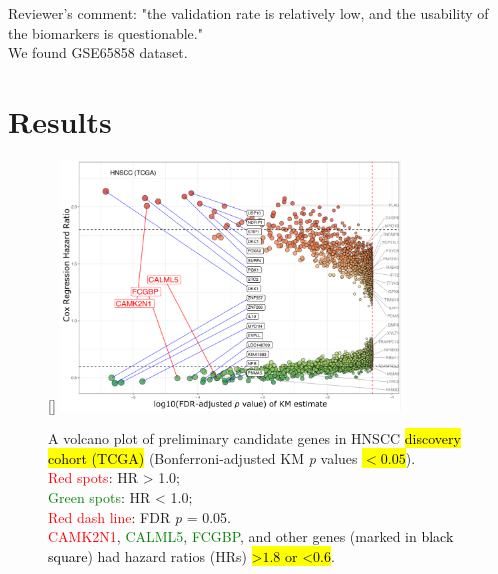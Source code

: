 \documentclass[
paper=landscape,
paper=160mm:90mm, %
fontsize=11pt, %
pagesize, %
parskip=half-, %
]{scrartcl} %
\theoremstyle{mythmstyle} %
\begin{document}
Reviewer's comment: "the validation rate is relatively low, and the usability of the biomarkers is questionable."\\

We found GSE65858 dataset.

\clearpage
\section{Results} %


\clearpage

\thispagestyle{headings}

\begin{figure}[ht]

[\FBwidth]
{    \includegraphics[width=9cm]{Rplot_TCGA_HNSCC_CoxHR_CAMK2N1_top3FDRKM.pdf}}
{\captionsetup{labelformat=empty}    
\caption{A volcano plot of preliminary candidate genes in HNSCC \hl{discovery cohort (TCGA)} {\tiny (Bonferroni-adjusted KM \textit{p} values \hl{$< 0.05$})}.\\
{\tiny    \textcolor{red}{Red spots}: HR > 1.0;\\
    \textcolor{green}{Green spots}: HR < 1.0;\\
    \textcolor{red}{Red dash line}: FDR \textit{p} = 0.05.}\\
    \textcolor{red}{CAMK2N1}, \textcolor{green}{CALML5}, \textcolor{green}{FCGBP}, and  other genes (marked in \textcolor{black}{black square}) had hazard ratios (HRs) \hl{>$1.8$ or <$0.6$}.
    }}
\end{figure}
\end{document}
